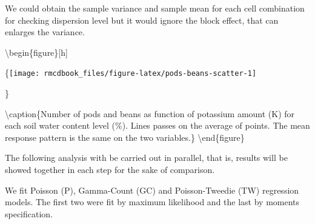 \documentclass[9pt,a5paper,]{book}
\newenvironment{Shaded}{}{}
\newcommand{\KeywordTok}[1]{\textbf{{#1}}}
\newcommand{\DataTypeTok}[1]{\underline{{#1}}}
\newcommand{\DecValTok}[1]{{#1}}
\newcommand{\StringTok}[1]{{#1}}
\newcommand{\OtherTok}[1]{{#1}}
\newcommand{\NormalTok}[1]{{#1}}
\renewenvironment{Shaded}{\color{inputcolor}}{}
\renewcommand{\DataTypeTok}[1]{{#1}}
\theoremstyle{definition}
\theoremstyle{definition}
\theoremstyle{remark}
\begin{document}
We could obtain the sample variance and sample mean for each cell
combination for checking dispersion level but it would ignore the block
effect, that can enlarges the variance.

\begin{Shaded}
\end{Shaded}

\textbackslash{}begin\{figure\}{[}h{]}

\{\centering \texttt{[image: rmcdbook\_files/figure-latex/pods-beans-scatter-1]}

\}

\textbackslash{}caption\{Number of pods and beans as function of
potassium amount (K) for each soil water content level (\%). Lines
passes on the average of points. The mean response pattern is the same
on the two variables.\}\label{fig:pods-beans-scatter}
\textbackslash{}end\{figure\}

The following analysis with be carried out in parallel, that is, results
will be showed together in each step for the sake of comparison.

We fit Poisson (P), Gamma-Count (GC) and Poisson-Tweedie (TW) regression
models. The first two were fit by maximum likelihood and the last by
moments specification.
\end{document}
